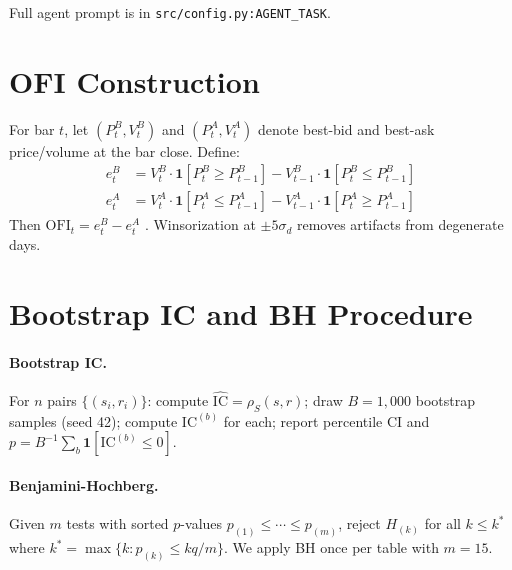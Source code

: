 \documentclass[11pt, letterpaper]{article}
\begin{document}
Full agent prompt is in \texttt{src/config.py:AGENT\_TASK}.

\section{OFI Construction}
\label{app:ofi}

For bar $t$, let $(P^B_t, V^B_t)$ and $(P^A_t, V^A_t)$ denote best-bid and best-ask
price/volume at the bar close. Define:
\begin{align}
    e^B_t &= V^B_t \cdot \mathbf{1}[P^B_t \geq P^B_{t-1}]
             - V^B_{t-1} \cdot \mathbf{1}[P^B_t \leq P^B_{t-1}] \\
    e^A_t &= V^A_t \cdot \mathbf{1}[P^A_t \leq P^A_{t-1}]
             - V^A_{t-1} \cdot \mathbf{1}[P^A_t \geq P^A_{t-1}]
\end{align}
Then $\mathrm{OFI}_t = e^B_t - e^A_t$ \citep{cont2014price}. Winsorization at
$\pm 5\sigma_d$ removes artifacts from degenerate days.

\section{Bootstrap IC and BH Procedure}
\label{app:stats}

\paragraph{Bootstrap IC.} For $n$ pairs $\{(s_i, r_i)\}$: compute
$\widehat{\mathrm{IC}} = \rho_S(s,r)$; draw $B = 1{,}000$ bootstrap samples
(seed 42); compute $\mathrm{IC}^{(b)}$ for each; report percentile CI and
$p = B^{-1}\sum_b \mathbf{1}[\mathrm{IC}^{(b)} \leq 0]$.

\paragraph{Benjamini-Hochberg.} Given $m$ tests with sorted $p$-values
$p_{(1)} \leq \cdots \leq p_{(m)}$, reject $H_{(k)}$ for all $k \leq k^*$ where
$k^* = \max\{k: p_{(k)} \leq kq/m\}$. We apply BH once per table with $m = 15$.


\end{document}
